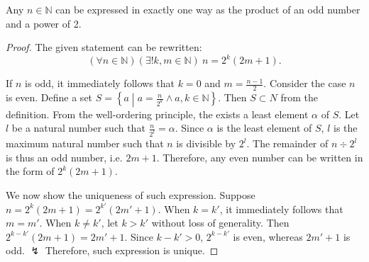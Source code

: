 \documentclass[../main.tex]{subfiles}
\begin{document}
\begin{prop} \label{prop:oddpower}
    Any $n \in \mathbb N$ can be expressed in exactly one way as the product of an odd number and a power of 2.
\end{prop}
\begin{proof}
    The given statement can be rewritten:
    \[
        (\forall n \in \mathbb{N})(\exists ! k, m \in \mathbb N)\ n = 2^k (2m + 1).
    \]

    If $n$ is odd, it immediately follows that $k = 0$ and $m = \frac{n - 1}{2}$.
    Consider the case $n$ is even.
    Define a set $S = \left\{ a \middle | a = \frac{n}{2^k} \wedge a, k \in \mathbb{N}\right\}$.
    Then $S \subset N$ from the definition.
    From the well-ordering principle, the exists a least element $\alpha$ of $S$.
    Let $l$ be a natural number such that $\frac{n}{2^l} = \alpha$.
    Since $\alpha$ is the least element of $S$, $l$ is the maximum natural number such that $n$ is divisible by $2^l$.
    The remainder of $n \div 2^l$ is thus an odd number, i.e. $2m + 1$.
    Therefore, any even number can be written in the form of $2^k (2m + 1)$.

    We now show the uniqueness of such expression.
    Suppose $n = 2^k (2m + 1) = 2^{k'} (2m' + 1)$.
    When $k = k'$, it immediately follows that $m = m'$.
    When $k \neq k'$, let $k > k'$ without loss of generality.
    Then $2^{k - k'} (2m + 1) = 2m' + 1$.
    Since $k - k' > 0$, $2^{k - k'}$ is even, whereas $2m' + 1$ is odd. $\lightning$
    Therefore, such expression is unique.
\end{proof}
\end{document}
